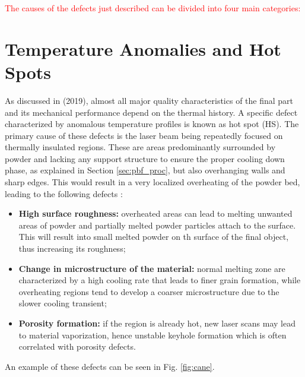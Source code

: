 \textcolor{red}{The causes of the defects just described can be divided into four main categories:}





\section{Temperature Anomalies and Hot Spots}
\label{sec:hotspot}
As discussed in \citeauthor{williams_situ_2019} (2019), almost all major quality characteristics of the final part and its mechanical performance depend on the thermal history. A specific defect characterized by anomalous temperature profiles is known as hot spot (HS). The primary cause of these defects is the laser beam being repeatedly focused on thermally insulated regions. These are areas predominantly surrounded by powder and lacking any support structure to ensure the proper cooling down phase, as explained in Section \ref{sec:pbf_proc}, but also overhanging walls and sharp edges. This would result in a very localized overheating of the powder bed, leading to the following defects \cite{bugatti_towards_2022}:
\begin{itemize}
    \item \textbf{High surface roughness:} overheated areas can lead to melting unwanted areas of powder and partially melted powder particles attach to the surface. This will result into small melted powder on th surface of the final object, thus increasing its roughness;
    \item \textbf{Change in microstructure of the material:} normal melting zone are characterized by a high cooling rate that leads to finer grain formation, while overheating regions tend to develop a coarser microstructure due to the slower cooling transient;
    \item \textbf{Porosity formation:} if the region is already hot, new laser scans may lead to material vaporization, hence unstable keyhole formation which is often correlated with porosity defects.
\end{itemize} An example of these defects can be seen in Fig. \ref{fig:cane}.

